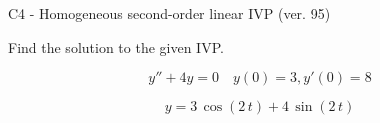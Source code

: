 \begin{exercise}
  \begin{exerciseTitle}C4 - Homogeneous second-order linear IVP (ver. 95)\end{exerciseTitle}
  \begin{exerciseStatement}
    
Find the solution to the given IVP.

    
\[y''+4y = 0 \hspace{1em} y(0) = 3 , y'(0) = 8\]

  \end{exerciseStatement}
  \begin{exerciseAnswer}
    
\[y= 3 \, \cos\left(2 \, t\right) + 4 \, \sin\left(2 \, t\right)\]

  \end{exerciseAnswer}
\end{exercise}